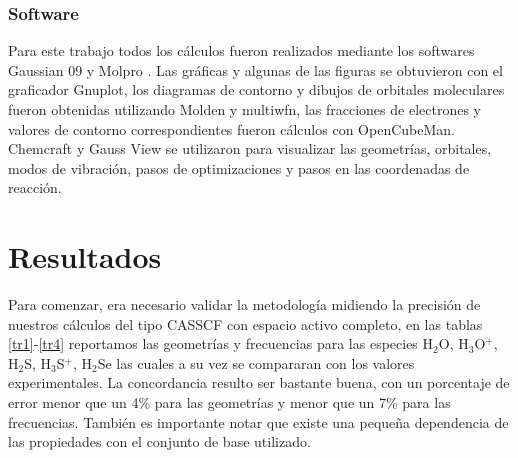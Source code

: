 \documentclass[12pt]{report}
\begin{document}
\subsection{Software}
Para este trabajo todos los cálculos fueron  realizados mediante los softwares Gaussian 09 \cite{Gaussian} y Molpro\cite{Molpro} . Las gráficas y algunas de las figuras se obtuvieron con el graficador Gnuplot\cite{Gnuplot}, los diagramas de contorno y dibujos de orbitales moleculares fueron obtenidas utilizando Molden\cite{Molden} y multiwfn\cite{Multiwfn}, las fracciones de electrones y valores de contorno correspondientes fueron cálculos con OpenCubeMan\cite{opencubeman}. Chemcraft\cite{Chemcraft} y Gauss View\cite{Gaussian} se utilizaron para visualizar las geometrías, orbitales, modos de vibración, pasos de optimizaciones y pasos en las coordenadas de reacción.
\newpage

\chapter{Resultados}
Para comenzar, era necesario validar la metodología midiendo la precisión de nuestros cálculos del tipo CASSCF con espacio activo completo, en las tablas \ref{tr1}-\ref{tr4} reportamos las geometrías y frecuencias para las especies H$_2$O, H$_3$O$^+$, H$_2$S, H$_3$S$^+$, H$_2$Se las cuales a su vez se compararan con los valores experimentales. La concordancia resulto ser bastante buena, con un porcentaje de error menor que un 4\% para las geometrías y menor que un 7\% para las frecuencias. También es importante notar que existe una pequeña dependencia de las propiedades con el conjunto de base utilizado.


\begin{table}[ht!]
\centering
{}
\caption{Geometrías de equilibrio nivel CASSCF utilizando 8 electrones y 8 orbitales activos, de las especies H$_2$X(X=O,S,Se) y la comparación con el experimento. 
}
\label{tr1}
\end{table}
\end{document}
